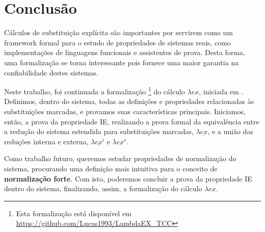 \chapter{Conclusão}

Cálculos de substituição explícita são importantes por servirem como um
framework formal para o estudo de propriedades de sistemas reais, como
implementações de linguagens funcionais e assistentes de prova. Desta forma, uma
formalização se torna interessante pois fornece uma maior garantia na
confiabilidade destes sistemas.

Neste trabalho, foi continuada a formalização \footnote{ Esta formalização está
    disponível em \url{https://github.com/Lucas1993/LambdaEX_TCC}} do cálculo
$\lambda ex$, iniciada em \cite{initial}. Definimos, dentro do sistema, todas as
definições e propriedades relacionadas às substituições marcadas, e provamos
suas características principais. Iniciamos, então, a prova da propriedade IE,
realizando a prova formal da equivalência entre a redução do sistema estendida
para substituições marcadas, $\lambda \underline{ex}$, e a união das reduções
interna e externa, $\lambda \underline{ex}^i$ e $\lambda \underline{ex}^e$.

Como trabalho futuro, queremos estudar propriedades de normalização do sistema,
procurando uma definição mais intuitiva para o conceito de \textbf{normalização
forte}. Com isto, poderemos concluir a prova da propriedade IE dentro do
sistema, finalizando, assim, a formalização do cálculo $\lambda ex$.

